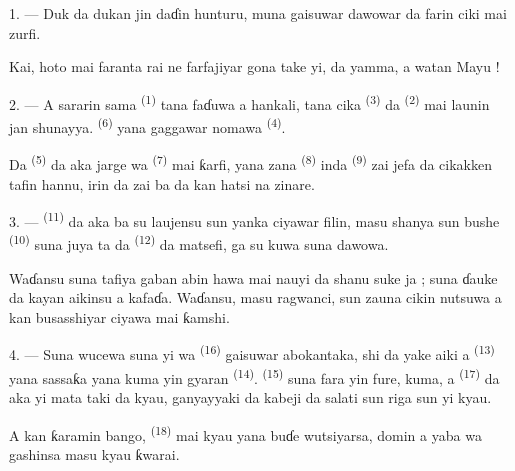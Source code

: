 \VUsaut{3.0mm}
\VUsaut{3.0mm}

\VUsaut{4.0mm}

1. --- Duk da dukan jin daɗin hunturu, muna gaisuwar dawowar
 da farin ciki mai zurfi.

Kai, hoto mai faranta rai ne farfajiyar gona take yi, da yamma, a
watan Mayu !

2. --- A sararin sama  \textsuperscript{(1)} tana faɗuwa a
hankali, tana cika  \textsuperscript{(3)} da 
\textsuperscript{(2)} mai launin jan shunayya.  \textsuperscript{(6)} yana gaggawar nomawa 
\textsuperscript{(4)}.

Da  \textsuperscript{(5)} da aka jarge wa
 \textsuperscript{(7)} mai ƙarfi, yana zana  \textsuperscript{(8)} inda  \textsuperscript{(9)}
zai jefa  da cikakken tafin hannu, irin da zai ba da kan
hatsi na zinare.

3. ---  \textsuperscript{(11)} da aka ba su
laujensu sun yanka ciyawar filin, masu shanya sun bushe
 \textsuperscript{(10)} suna juya ta da
 \textsuperscript{(12)} da matsefi, ga su
kuwa suna dawowa.

Waɗansu suna tafiya gaban abin hawa mai nauyi da shanu suke ja ; suna
ɗauke da kayan aikinsu a kafaɗa. Waɗansu, masu ragwanci, sun zauna
cikin nutsuwa a kan busasshiyar ciyawa mai ƙamshi.

4. --- Suna wucewa suna yi wa  \textsuperscript{(16)}
gaisuwar abokantaka, shi da yake aiki a 
\textsuperscript{(13)} yana sassaƙa  yana
kuma yin gyaran  \textsuperscript{(14)}.
 \textsuperscript{(15)} suna fara yin fure, kuma,
a  \textsuperscript{(17)} da aka yi mata taki
da kyau, ganyayyaki da kabeji da salati sun riga sun yi kyau.

A kan ƙaramin bango,  \textsuperscript{(18)} mai kyau
yana buɗe wutsiyarsa, domin a yaba wa gashinsa masu kyau ƙwarai.

\VUsaut{3.0mm}


